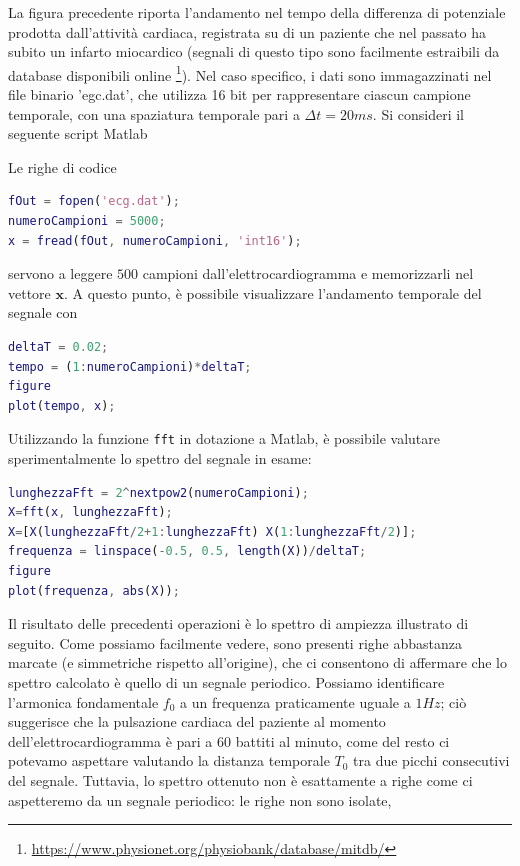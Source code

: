 \documentclass[12pt,oneside,openany]{memoir}
\numberwithin{equation}{subsection}
\begin{document}
La figura precedente riporta l'andamento nel tempo della differenza di
potenziale prodotta dall'attivit\`a cardiaca, registrata su di un paziente
che nel passato ha subito un infarto miocardico (segnali di questo tipo sono
facilmente estraibili da database disponibili online
\footnote{\href{https://www.physionet.org/physiobank/database/mitdb/}{https://www.physionet.org/physiobank/database/mitdb/}}).
Nel caso specifico, i dati sono immagazzinati nel file binario 'egc.dat', che
utilizza 16 bit per rappresentare ciascun campione temporale, con una spaziatura
temporale pari a $\Delta t = 20 ms$. Si consideri il seguente script Matlab

Le righe di codice
\begin{lstlisting}[frame=single, language=Matlab]
fOut = fopen('ecg.dat');
numeroCampioni = 5000;
x = fread(fOut, numeroCampioni, 'int16');
\end{lstlisting}
servono a leggere $500$ campioni dall'elettrocardiogramma e memorizzarli nel
vettore $\boldsymbol{x}$. A questo punto, \`e possibile visualizzare l'andamento
temporale del segnale con
\begin{lstlisting}[frame=single, language=Matlab]
deltaT = 0.02;
tempo = (1:numeroCampioni)*deltaT;
figure
plot(tempo, x);
\end{lstlisting}
Utilizzando la funzione \texttt{fft} in dotazione a Matlab, \`e possibile
valutare sperimentalmente lo spettro del segnale in esame:
\begin{lstlisting}[frame=single, language=Matlab]
lunghezzaFft = 2^nextpow2(numeroCampioni);
X=fft(x, lunghezzaFft);
X=[X(lunghezzaFft/2+1:lunghezzaFft) X(1:lunghezzaFft/2)];
frequenza = linspace(-0.5, 0.5, length(X))/deltaT;
figure
plot(frequenza, abs(X));
\end{lstlisting}
Il risultato delle precedenti operazioni \`e lo spettro di ampiezza illustrato
di seguito. Come possiamo facilmente vedere, sono presenti righe abbastanza
marcate (e simmetriche rispetto all'origine), che ci consentono di affermare che
lo spettro calcolato \`e quello di un segnale periodico. Possiamo identificare
l'armonica fondamentale $f_0$ a un frequenza praticamente uguale a $1 Hz$; ci\`o
suggerisce che la pulsazione cardiaca del paziente al momento
dell'elettrocardiogramma \`e pari a $60$ battiti al minuto, come del resto ci
potevamo aspettare valutando la distanza temporale $T_0$ tra due picchi
consecutivi del segnale. Tuttavia, lo spettro ottenuto non \`e esattamente a
righe come ci aspetteremo da un segnale periodico: le righe non sono isolate,
\end{document}
